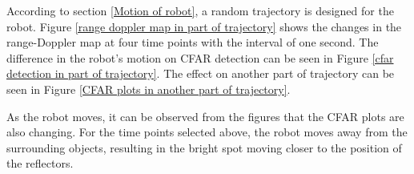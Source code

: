 \documentclass[12pt,DIV14,BCOR12mm,a4paper,footinclude=false,headinclude,parskip=half-,twoside,openright,cleardoublepage=empty,toc=index,bibliography=totoc,listof=totoc]{scrreprt}
\numberwithin{equation}{chapter}
\begin{document}
According to section \ref{Motion of robot}, a random trajectory is designed for the robot. Figure \ref{range doppler map in part of trajectory} shows the changes in the range-Doppler map at four time points with the interval of one second. The difference in the robot's motion on CFAR detection can be seen in Figure \ref{cfar detection in part of trajectory}. The effect on another part of trajectory can be seen in Figure \ref{CFAR plots in another part of trajectory}.

As the robot moves, it can be observed from the figures that the CFAR plots are also changing. For the time points selected above, the robot moves away from the surrounding objects, resulting in the bright spot moving closer to the position of the reflectors.

\begin{figure}[h]
    \centering
    \begin{subfigure}{0.45\textwidth}
        \centering
    \end{subfigure}\hspace{0.5cm}
    \begin{subfigure}{0.45\textwidth}
        \centering

\end{subfigure}
\end{figure}
\end{document}
